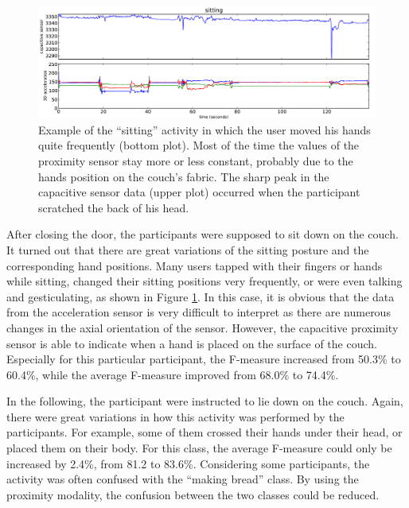 \documentclass[runningheads,a4paper]{llncs}
\begin{document}
\begin{figure}
	\centering
		\includegraphics[width=1.00\textwidth]{../Auswertung/images/eugen_2.pdf}
	\caption{Example of the ``sitting'' activity in which the user moved his hands quite frequently (bottom plot). Most of the time the values of the proximity sensor stay more or less constant, probably due to the hands position on the couch's fabric. The sharp peak in the capacitive sensor data (upper plot) occurred when the participant scratched the back of his head. }
	\label{fig:sitting}
\end{figure}

After closing the door, the participants were supposed to sit down on the couch. It turned out that there are great variations of the sitting posture and the corresponding hand positions. Many users tapped with their fingers or hands while sitting, changed their sitting positions very frequently, or were even talking and gesticulating, as shown in Figure \ref{fig:sitting}. In this case, it is obvious that the data from the acceleration sensor is very difficult to interpret as there are numerous changes in the axial orientation of the sensor. However, the capacitive proximity sensor is able to indicate when a hand is placed on the surface of the couch. Especially for this particular participant, the F-measure increased from 50.3\% to 60.4\%, while the average F-measure improved from 68.0\% to 74.4\%. 

In the following, the participant were instructed to lie  down on the couch. Again, there were great variations in how this activity was performed by the participants. For example, some of them crossed their hands under their head, or placed them on their body. For this class, the average F-measure could only be increased by 2.4\%, from 81.2 to 83.6\%. Considering some participants, the activity was often confused with the ``making bread'' class. By using the proximity modality, the confusion between the two classes could be reduced.
\end{document}
